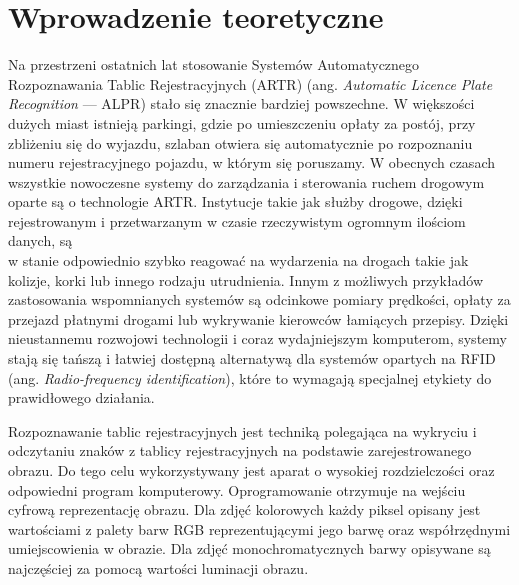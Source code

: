 %


\chapter{Wprowadzenie teoretyczne}\label{ch:wprowadzenie-teoretyczne}

Na przestrzeni ostatnich lat stosowanie Systemów Automatycznego Rozpoznawania Tablic Rejestracyjnych (ARTR) (ang. \textit{Automatic Licence Plate Recognition} --- ALPR) stało się znacznie bardziej powszechne.
W większości dużych miast istnieją parkingi, gdzie po umieszczeniu opłaty za postój, przy zbliżeniu się do wyjazdu, szlaban otwiera się automatycznie po rozpoznaniu numeru rejestracyjnego pojazdu, w którym się poruszamy.
W obecnych czasach wszystkie nowoczesne systemy do zarządzania i sterowania ruchem drogowym oparte są o technologie ARTR.
Instytucje takie jak służby drogowe, dzięki rejestrowanym i przetwarzanym w czasie rzeczywistym ogromnym ilościom danych, są \\w stanie odpowiednio szybko reagować na wydarzenia na drogach takie jak kolizje, korki lub innego rodzaju utrudnienia.
Innym z możliwych przykładów zastosowania wspomnianych systemów są odcinkowe pomiary prędkości, opłaty za przejazd płatnymi drogami lub wykrywanie kierowców łamiących przepisy.
Dzięki nieustannemu rozwojowi technologii i coraz wydajniejszym komputerom, systemy stają się tańszą i łatwiej dostępną alternatywą dla systemów opartych na RFID (ang. \textit{Radio-frequency identification}), które to wymagają specjalnej etykiety do prawidłowego działania.

Rozpoznawanie tablic rejestracyjnych jest techniką polegająca na wykryciu i odczytaniu znaków z tablicy rejestracyjnych na podstawie zarejestrowanego obrazu.
Do tego celu wykorzystywany jest aparat o wysokiej rozdzielczości oraz odpowiedni program komputerowy.
Oprogramowanie otrzymuje na wejściu cyfrową reprezentację obrazu.
Dla zdjęć kolorowych każdy piksel opisany jest wartościami z palety barw RGB reprezentującymi jego barwę oraz współrzędnymi umiejscowienia w obrazie.
Dla zdjęć monochromatycznych barwy opisywane są najczęściej za pomocą wartości luminacji obrazu.

